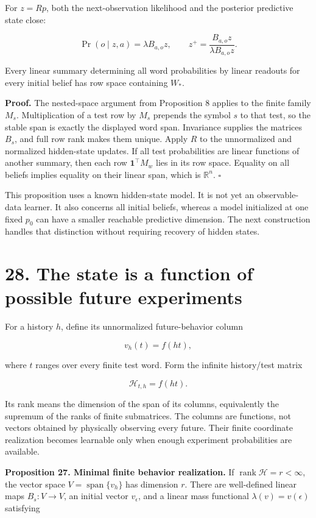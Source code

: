 \documentclass[11pt,letterpaper]{article}
\begin{document}
For \(z=Rp\), both the next-observation likelihood and the posterior
predictive state close:

\[
\Pr(o\mid z,a)=\lambda B_{a,o}z,\qquad
z^+=\frac{B_{a,o}z}{\lambda B_{a,o}z}.
\]

Every linear summary determining all word probabilities by linear
readouts for every initial belief has row space containing \(W_*\).

\textbf{Proof.} The nested-space argument from Proposition 8 applies to
the finite family \(M_s\). Multiplication of a test row by \(M_s\)
prepends the symbol \(s\) to that test, so the stable span is exactly
the displayed word span. Invariance supplies the matrices \(B_s\), and
full row rank makes them unique. Apply \(R\) to the unnormalized and
normalized hidden-state updates. If all test probabilities are linear
functions of another summary, then each row \(\mathbf1^\top M_w\) lies
in its row space. Equality on all beliefs implies equality on their
linear span, which is \(\mathbb R^n\). \(\square\)

This proposition uses a known hidden-state model. It is not yet an
observable-data learner. It also concerns all initial beliefs, whereas a
model initialized at one fixed \(p_0\) can have a smaller reachable
predictive dimension. The next construction handles that distinction
without requiring recovery of hidden states.

\section{28. The state is a function of possible future
experiments}\label{the-state-is-a-function-of-possible-future-experiments}

For a history \(h\), define its unnormalized future-behavior column

\[
v_h(t)=f(ht),
\]

where \(t\) ranges over every finite test word. Form the infinite
history/test matrix

\[
\mathscr H_{t,h}=f(ht).
\]

Its rank means the dimension of the span of its columns, equivalently
the supremum of the ranks of finite submatrices. The columns are
functions, not vectors obtained by physically observing every future.
Their finite coordinate realization becomes learnable only when enough
experiment probabilities are available.

\textbf{Proposition 27. Minimal finite behavior realization.} If
\(\operatorname{rank}\mathscr H=r<\infty\), the vector space
\(V=\operatorname{span}\{v_h\}\) has dimension \(r\). There are
well-defined linear maps \(B_s:V\to V\), an initial vector
\(v_\epsilon\), and a linear mass functional \(\lambda(v)=v(\epsilon)\)
satisfying
\end{document}
